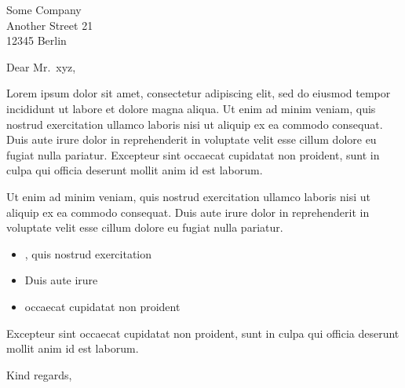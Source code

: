 \documentclass[version=last, fromalign=right, fontsize=11pt]{scrlttr2}
\newcommand{\customhref}[2]{%
  \href{#1}{%
    \tcbox[customunderline]{%
      \raisebox{0pt}[0pt][0pt]{#2}%
    }%
  }%
}
\begin{document}
\begin{letter}{Some Company\\Another Street 21\\12345 Berlin}
  \opening{Dear Mr.~xyz,}

  Lorem ipsum dolor sit amet, consectetur adipiscing elit, sed do
  eiusmod tempor incididunt ut labore et dolore magna aliqua. Ut enim ad
  minim veniam, quis nostrud exercitation ullamco laboris nisi ut
  aliquip ex ea commodo consequat. Duis aute irure dolor in
  reprehenderit in voluptate velit esse cillum dolore eu fugiat nulla
  pariatur. Excepteur sint occaecat cupidatat non proident, sunt in
  culpa qui officia deserunt mollit anim id est laborum.

  Ut enim ad minim veniam, quis nostrud exercitation ullamco laboris
  nisi ut aliquip ex ea commodo consequat. Duis aute irure dolor in
  reprehenderit in voluptate velit esse cillum dolore eu fugiat nulla
  pariatur.

  \begin{itemize}
  \item
    \customhref{https://externallink.com}{Ut enim ad minim veniam}, quis
    nostrud exercitation
  \item
    Duis aute irure
    \customhref{https://externallink.com}{dolor in reprehenderit}
  \item
    \customhref{https://externallink.com}{Excepteur sint} occaecat
    cupidatat non proident
  \end{itemize}

  Excepteur sint occaecat cupidatat non proident, sunt in culpa qui
  officia deserunt mollit anim id est laborum.

  \closing{Kind regards,}
  \vspace{-5cm}
\end{letter}
\end{document}
